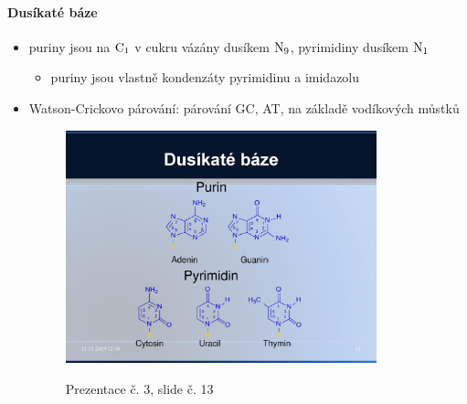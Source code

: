 \documentclass[DIV=8]{scrreprt}
\begin{document}
\paragraph{Dusíkaté báze}
\begin{itemize}[nosep]
    \item puriny jsou na \(\ce{C1}\) v cukru vázány dusíkem \(\ce{N9}\), pyrimidiny dusíkem \(\ce{N1}\)
\begin{itemize}[nosep]
    \item puriny jsou vlastně kondenzáty pyrimidinu a imidazolu
\end{itemize}

    \item Watson-Crickovo párování: párování GC, AT, na základě vodíkových můstků \begin{figure}
    \caption{Prezentace č. 3, slide č. 13}
    \includegraphics[width=0.85\textwidth]{slides-3/slide-13.jpg}
    \centering
    \label{slides-3-slide-13}
\end{figure}


\end{itemize}
\end{document}
